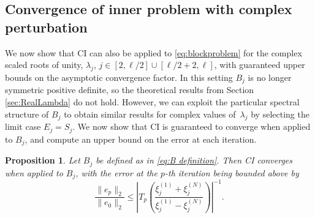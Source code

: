 \documentclass{article}
\newtheorem{prop}{Proposition}
\theoremstyle{definition}
\begin{document}
{		\subsection{Convergence of inner problem with complex perturbation}\label{sec:ComplexLambda}
		We now show that CI can also be applied to \eqref{eq:blockproblem} for the complex scaled roots of unity, $\lambda_j$, $j\in[2,\ell/2]\cup[\ell/2+2,\ell]$, with guaranteed upper bounds on the asymptotic convergence factor. In this setting $B_j$ is no longer symmetric positive definite, so the theoretical results from Section \ref{sec:RealLambda} do not hold. However, we can exploit the particular spectral structure of $B_j$ to obtain similar results for complex values of~$\lambda_j$ by selecting the limit case $E_j = S_j$. We now show that CI is guaranteed to converge when applied to $B_j$, and compute an upper bound on the error at each iteration.
		
		
		\begin{prop}\label{prop:errorbound}
			Let $B_j$ be defined as in \eqref{eq:B definition}. 
			Then CI converges when applied to $B_j$, with  the error at the $p$-th iteration being bounded above by \begin{equation*}
				\frac{\| {e}_p \|_2}{\| {e}_0 \|_2} \le {\left| T_p \left(\frac{\xi_j^{(1)}+\xi_j^{(N)}}{\xi_j^{(1)}-\xi_j^{(N)}}\right) \right|}^{-1}.\end{equation*}
		\end{prop}
		
}
\end{document}
